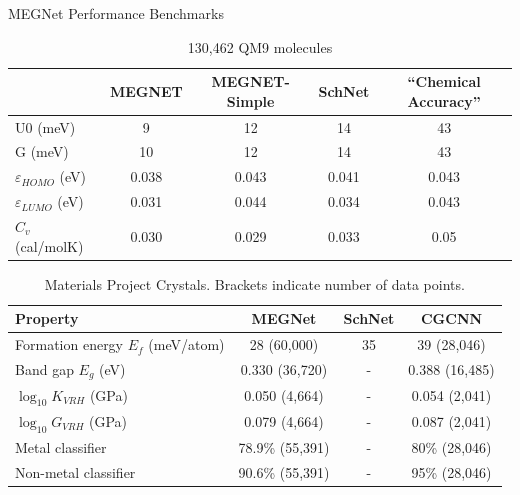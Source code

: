 \documentclass[aspectratio=169]{beamer}
\begin{document}
    \begin{frame}{MEGNet Performance Benchmarks}
        \footnotesize
        \begin{table}[]
            \centering
            \begin{tabular}{l|c|c|c|c}
                & MEGNET & MEGNET-Simple & SchNet & “Chemical Accuracy” \\
                \hline
                U0 (meV)                  & 9      & 12            & 14     & 43                  \\
                G (meV)                   & 10     & 12            & 14     & 43                  \\
                $\varepsilon_{HOMO}$ (eV) & 0.038  & 0.043         & 0.041  & 0.043               \\
                $\varepsilon_{LUMO}$ (eV) & 0.031  & 0.044         & 0.034  & 0.043               \\
                $C_v$ (cal/molK)          & 0.030  & 0.029         & 0.033  & 0.05
            \end{tabular}
            \caption{130,462 QM9 molecules}
        \end{table}
        \begin{table}[]
            \centering
            \begin{tabular}{l|c|c|c}
                Property                          & MEGNet          & SchNet & CGCNN          \\
                \hline
                Formation energy $E_f$ (meV/atom) & 28 (60,000)     & 35     & 39 (28,046)    \\
                Band gap $E_g$ (eV)               & 0.330 (36,720)  & -      & 0.388 (16,485) \\
                $\log_{10} K_{VRH}$ (GPa)         & 0.050 (4,664)   & -      & 0.054 (2,041)  \\
                $\log_{10} G_{VRH}$ (GPa)         & 0.079 (4,664)   & -      & 0.087 (2,041)  \\
                Metal classifier                  & 78.9\% (55,391) & -      & 80\% (28,046)  \\
                Non-metal classifier              & 90.6\% (55,391) & -      & 95\% (28,046)
            \end{tabular}
            \caption{Materials Project Crystals. Brackets indicate number of data points.}
        \end{table}
    \end{frame}
\end{document}
